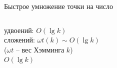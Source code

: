 \documentclass{beamer}
\begin{document}
\begin{frame}{Быстрое умножение точки на число}
\begin{columns}
\begin{column}{0.5\textwidth}
\begin{center}
\begin{tcolorbox}[enhanced,hbox,colback=box-blue-color!15,colframe=box-blue-color,title=Сложность,center title]
\begin{varwidth}{\textwidth}
							удвоений: $O(\lg k)$ \\
							сложений: $\omega t(k)\sim O (\lg k)$\\
							($\omega t$ -- вес Хэмминга $k$)\\
							 $O\left( {\lg k} \right)$
						\end{varwidth}
					\end{tcolorbox}	
				\end{center}
			\end{column}
		\end{columns}
	\end{frame}
	
\end{document}
